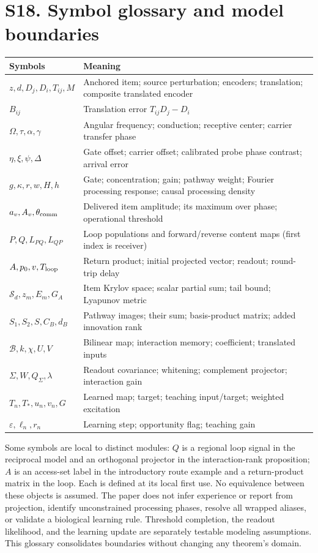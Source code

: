 \section*{S18. Symbol glossary and model boundaries}
\begin{center}\small\begin{tabular}{@{}p{.25\linewidth}p{.67\linewidth}@{}}\toprule
Symbols & Meaning\\\midrule
$z,d,D_j,D_i,T_{ij},M$ & Anchored item; source perturbation; encoders; translation; composite translated encoder\\
$B_{ij}$ & Translation error $T_{ij}D_j-D_i$\\
$\Omega,\tau,\alpha,\gamma$ & Angular frequency; conduction; receptive center; carrier transfer phase\\
$\eta,\xi,\psi,\Delta$ & Gate offset; carrier offset; calibrated probe phase contrast; arrival error\\
$g,\kappa,r,w,H,h$ & Gate; concentration; gain; pathway weight; Fourier processing response; causal processing density\\
$a_v,A_v,\theta_{\rm comm}$ & Delivered item amplitude; its maximum over phase; operational threshold\\
$P,Q,L_{PQ},L_{QP}$ & Loop populations and forward/reverse content maps (first index is receiver)\\
$A,p_0,v,T_{\rm loop}$ & Return product; initial projected vector; readout; round-trip delay\\
$\mathcal S_d,z_m,E_m,G_A$ & Item Krylov space; scalar partial sum; tail bound; Lyapunov metric\\
$S_1,S_2,S,C_B,d_B$ & Pathway images; their sum; basis-product matrix; added innovation rank\\
$\mathcal B,k,\chi,U,V$ & Bilinear map; interaction memory; coefficient; translated inputs\\
$\Sigma,W,Q_\Sigma,\lambda$ & Readout covariance; whitening; complement projector; interaction gain\\
$T_n,T_*,u_n,v_n,G$ & Learned map; target; teaching input/target; weighted excitation\\
$\varepsilon,\ell_n,r_n$ & Learning step; opportunity flag; teaching gain\\\bottomrule
\end{tabular}\end{center}
Some symbols are local to distinct modules: $Q$ is a regional loop signal in the reciprocal model and an orthogonal projector in the interaction-rank proposition; $A$ is an access-set label in the introductory route example and a return-product matrix in the loop. Each is defined at its local first use. No equivalence between these objects is assumed.
The paper does not infer experience or report from projection, identify unconstrained processing phases, resolve all wrapped aliases, or validate a biological learning rule. Threshold completion, the readout likelihood, and the learning update are separately testable modeling assumptions. This glossary consolidates boundaries without changing any theorem's domain.
